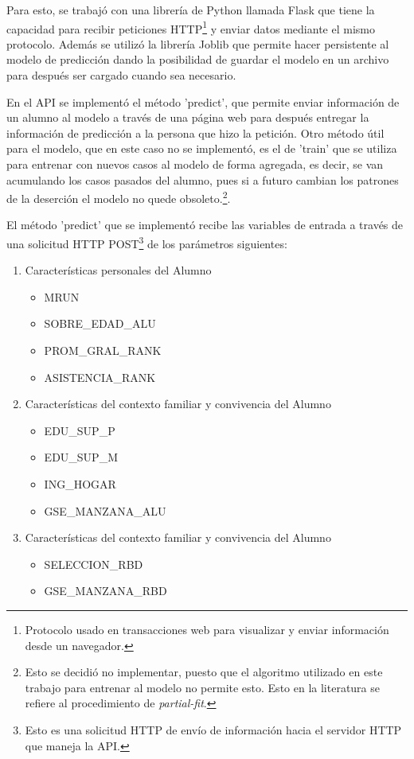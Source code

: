 Para esto, se trabajó con una librería de Python llamada Flask que tiene la capacidad para recibir peticiones HTTP\footnote{Protocolo usado en transacciones web para visualizar y enviar información desde un navegador.} y enviar datos mediante el mismo protocolo. Además se utilizó la librería Joblib que permite hacer persistente al modelo de predicción dando la posibilidad de guardar el modelo en un archivo para después ser cargado cuando sea necesario.

En el API se implementó el método 'predict', que permite enviar información de un alumno al modelo a través de una página web para después entregar la información de predicción a la persona que hizo la petición. Otro método útil para el modelo, que en este caso no se implementó, es el de 'train' que se utiliza para entrenar con nuevos casos al modelo de forma agregada, es decir, se van acumulando los casos pasados del alumno, pues si a futuro cambian los patrones de la deserción el modelo no quede obsoleto.\footnote{Esto se decidió no implementar, puesto que el algoritmo utilizado en este trabajo para entrenar al modelo no permite esto. Esto en la literatura se refiere al procedimiento de \textit{partial-fit}.}.

El método 'predict' que se implementó recibe las variables de entrada a través de una solicitud HTTP POST\footnote{Esto es una solicitud HTTP de envío de información hacia el servidor HTTP que maneja la API.} de los parámetros siguientes:
\begin{enumerate}
\item Características personales del Alumno
    \begin{itemize}
    \item MRUN
    \item SOBRE_EDAD_ALU
    \item PROM_GRAL_RANK
    \item ASISTENCIA_RANK
    \end{itemize}
\item Características del contexto familiar y convivencia del Alumno
    \begin{itemize}
    \item EDU_SUP_P
    \item EDU_SUP_M
    \item ING_HOGAR
    \item GSE_MANZANA_ALU
    \end{itemize}
\item Características del contexto familiar y convivencia del Alumno
    \begin{itemize}
    \item SELECCION_RBD
    \item GSE_MANZANA_RBD
    \end{itemize}
\end{enumerate}

